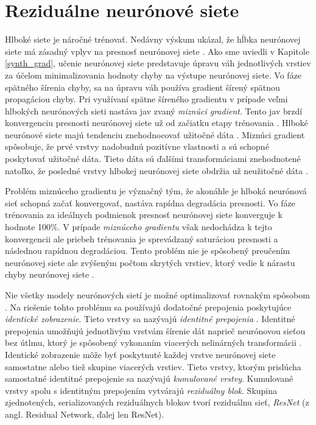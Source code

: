 \chapter{Reziduálne neurónové siete}

\label{ResNet_kap2}

Hlboké siete je náročné trénovať. Nedávny výskum ukázal, že hĺbka neurónovej siete má zásadný vplyv na presnosť neurónovej siete \cite{Wu2017, He2016, Targ2016}. Ako sme uviedli v Kapitole \ref{synth_grad}, učenie neurónovej siete predstavuje úpravu váh jednotlivých vrstiev za účelom minimalizovania hodnoty chyby na výstupe neurónovej siete. Vo fáze spätného šírenia chyby, sa na úpravu váh používa gradient šírený spätnou propagáciou chyby. Pri využívaní spätne šíreného gradientu v prípade veľmi hlbokých neurónových sieti nastáva jav zvaný \textit{miznúci gradient}.
Tento jav brzdí konvergenciu presnosti neurónovej siete už od začiatku etapy trénovania \cite{Wu2017}. Hlboké neurónové siete majú tendenciu znehodnocovať užitočné dáta \cite{Targ2016}. Miznúci gradient spôsobuje, že prvé vrstvy nadobudnú pozitívne vlastnosti a sú schopné poskytovať užitočné dáta. Tieto dáta sú ďalšími transformáciami znehodnotené natoľko, že posledné vrstvy hlbokej neurónovej siete obdržia už neužitočné dáta \cite{Wu2017}.

Problém miznúceho gradientu je význačný tým, že akonáhle je hlboká neurónová sieť schopná začať konvergovať, nastáva rapídna degradácia presnosti. Vo fáze trénovania za ideálnych podmienok presnosť neurónovej siete konverguje k hodnote 100\%. V prípade \textit{miznúceho gradientu} však nedochádza k tejto konvergencii ale priebeh trénovania je sprevádzaný saturáciou presnosti a následnou rapídnou degradáciou. Tento problém nie je spôsobený preučením neurónovej siete ale zvýšeným počtom skrytých vrstiev, ktorý vedie k nárastu chyby neurónovej siete \cite{Wu2017}. 

Nie všetky modely neurónových sietí je možné optimalizovať rovnakým spôsobom \cite{Wu2017}. Na riešenie tohto problému sa používajú dodatočné prepojenia poskytujúce \textit{identické zobrazenie}. Tieto vrstvy sa nazývajú \textit{identitné prepojenia} \cite{Wu2017, Targ2016}. Identitné prepojenia umožňujú jednotlivým vrstvám šírenie dát naprieč neurónovou sieťou bez útlmu, ktorý je spôsobený vykonaním viacerých nelinárných transformácii \cite{Targ2016}. Identické zobrazenie môže byť poskytnuté každej vrstve neurónovej siete samostatne alebo tiež skupine viacerých vrstiev. Tieto vrstvy, ktorým prislúcha samostatné identitné prepojenie sa nazývajú \textit{kumulované vrstvy}. Kumulované vrstvy spolu s identitným prepojením vytvárajú \textit{reziduálny blok}. Skupina zjednotených, serializovaných reziduálnych blokov tvorí reziduálnu sieť, \textit{ResNet} (z angl. Residual Network, ďalej len ResNet).

